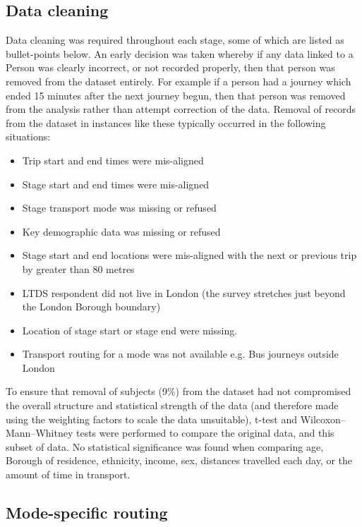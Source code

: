 \subsection{Data cleaning}
\label{sec:reconstruction_data_cleaning}

Data cleaning was required throughout each stage, some of which are listed as bullet-points below. An early decision was taken whereby if any data linked to a Person was clearly incorrect, or not recorded properly, then that person was removed from the dataset entirely. For example if a person had a journey which ended 15 minutes after the next journey begun, then that person was removed from the analysis rather than attempt correction of the data. Removal of records from the dataset in instances like these typically occurred in the following situations:

\begin{itemize}
\item Trip start and end times were mis-aligned
\item Stage start and end times were mis-aligned
\item Stage transport mode was missing or refused
\item Key demographic data was missing or refused
\item Stage start and end locations were mis-aligned with the next or previous trip by greater than 80 metres
\item LTDS respondent did not live in London (the survey stretches just beyond the London Borough boundary)
\item Location of stage start or stage end were missing.
\item Transport routing for a mode was not available e.g. Bus journeys outside London
\end{itemize}

To ensure that removal of subjects (9\%) from the dataset had not compromised the overall structure and statistical strength of the data (and therefore made using the weighting factors to scale the data unsuitable), t-test and Wilcoxon–Mann–Whitney tests were performed to compare the original data, and this subset of data. No statistical significance was found when comparing age, Borough of residence, ethnicity, income, sex, distances travelled each day, or the amount of time in transport.

\subsection{Mode-specific routing}
\label{sec:reconstruction_mode_routing}

